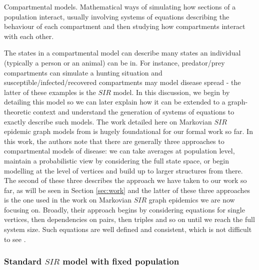 \documentclass[../report.tex]{subfiles}
\begin{document}
\begin{definition}{Compartmental models.}
Mathematical ways of simulating how sections of a population interact, usually involving systems of equations describing the behaviour of each compartment and then studying how compartments interact with each other. 
\end{definition}
The states in a compartmental model can describe many states an individual (typically a person or an animal) can be in. For instance, predator/prey compartments can simulate a hunting situation and susceptible/infected/recovered compartments may model disease spread - the latter of these examples is the $SIR$ model. In this discussion, we begin by detailing this model so we can later explain how it can be extended to a graph-theoretic context and understand the generation of systems of equations to exactly describe such models. The work detailed here on Markovian $SIR$ epidemic graph models from \cite{kiss_2014} is hugely foundational for our formal work so far. In this work, the authors note that there are generally three approaches to compartmental models of disease: we can take averages at population level, maintain a probabilistic view by considering the full state space, or begin modelling at the level of vertices and build up to larger structures from there. The second of these three describes the approach we have taken to our work so far, as will be seen in Section \ref{sec:work} and the latter of these three approaches is the one used in the work on Markovian $SIR$ graph epidemics we are now focusing on. Broadly, their approach begins by considering equations for single vertices, then dependencies on pairs, then triples and so on until we reach the full system size. Such equations are well defined and consistent, which is not difficult to see \cite{kiss_2014}.

\subsubsection{Standard $SIR$ model with fixed population}
\end{document}

